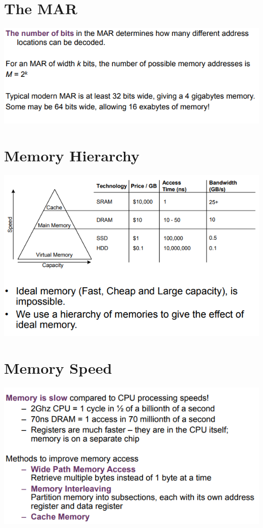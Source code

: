 \documentclass{article}[18pt]
\begin{document}
\section{The MAR}
\begin{center}
	\includegraphics[scale=0.7]{MAR}
\end{center}
\section{Memory Hierarchy}
\begin{center}
	\includegraphics[scale=0.7]{heirarchy}
\end{center}
\section{Memory Speed}
\begin{center}
	\includegraphics[scale=0.7]{soeed}
\end{center}
\end{document}
